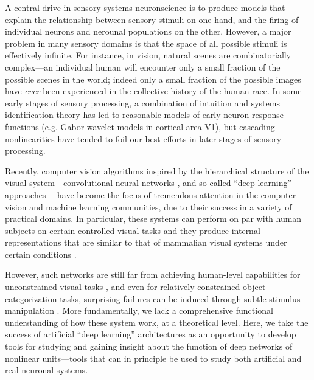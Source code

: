 A central drive in sensory systems neuronscience is to produce models that explain the relationship between sensory stimuli on one hand, and the firing of individual neurons and nerounal populations on the other.
However, a major problem in many sensory domains is that the space of all possible stimuli is effectively infinite.  For instance, in vision, natural scenes are combinatorially complex---an individual human will encounter only a small fraction of the possible scenes in the world; indeed only a small fraction of the possible images have \emph{ever} been experienced in the collective history of the human race.
In some early stages of sensory processing, a combination of intuition and systems identification theory has led to reasonable models of early neuron response functions (e.g. Gabor wavelet models in cortical area V1), but cascading nonlinearities have tended to foil our best efforts in later stages of sensory processing.


Recently, computer vision algorithms inspired by the hierarchical structure of the visual system---convolutional neural networks \cite{fukushima1980neocognitron, lecun1998gradient, riesenhuber1999hierarchical}, and so-called ``deep learning'' approaches \cite{krizhevsky2012imagenet}---have become the focus of tremendous attention in the computer vision and machine learning communities, due to their success in a variety of practical domains. 
In particular, these systems can perform on par with human subjects on certain controlled visual tasks \cite{serre2007feedforward, cirecsan2012multi, russakovsky2014imagenet, taigman2013deepface, sun2014deep, viglarge} and they produce internal representations that are similar to that of mammalian visual systems under certain conditions \cite{yamins2014performance, cadieu2014deep}.

However, such networks are still far from achieving human-level capabilities for unconstrained visual tasks \cite{ghodrati2014feedforward}, and even for relatively constrained object categorization tasks, surprising failures can be induced through subtle stimulus manipulation \cite{szegedy2013intriguing}. 
More fundamentally, we lack a comprehensive functional understanding of how these system work, at a theoretical level. Here, we take the success of artificial ``deep learning'' architectures as an opportunity to develop tools for studying and gaining insight about the function of deep networks of nonlinear units---tools that can in principle be used to study both artificial and real neuronal systems. 

